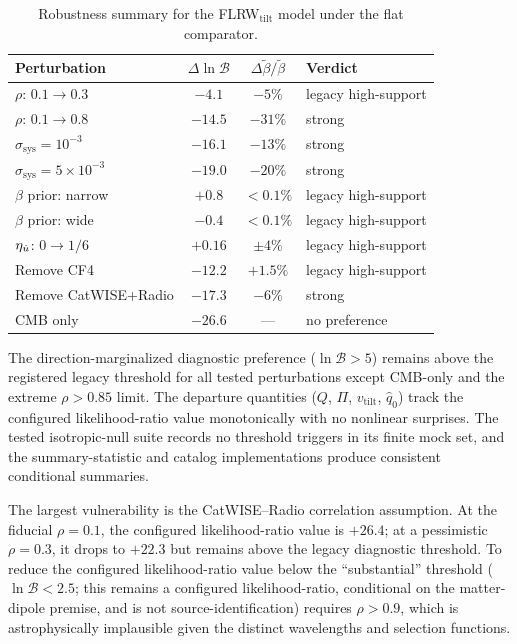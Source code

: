 \begin{table}[t]
\caption{Robustness summary for the FLRW$_\mathrm{tilt}$ model
  under the flat comparator.}
\label{tab:robust-summary}
\centering\small
\begin{tabular}{lccl}
\hline\hline
Perturbation & $\Delta\ln\mathcal{B}$ &
  $\Delta\tilde{\beta}/\tilde{\beta}$ & Verdict \\
\hline
$\rho$: $0.1 \to 0.3$ & $-4.1$ & $-5\%$ & legacy high-support \\
$\rho$: $0.1 \to 0.8$ & $-14.5$ & $-31\%$ & strong \\
$\sigma_{\mathrm{sys}} = 10^{-3}$ & $-16.1$ & $-13\%$ & strong \\
$\sigma_{\mathrm{sys}} = 5\!\times\!10^{-3}$ & $-19.0$ & $-20\%$
  & strong \\
$\beta$ prior: narrow & $+0.8$ & $< 0.1\%$ & legacy high-support \\
$\beta$ prior: wide   & $-0.4$ & $< 0.1\%$ & legacy high-support \\
$\eta_{\dot{u}}$: $0 \to 1/6$ & $+0.16$ & $\pm 4\%$ & legacy high-support \\
Remove CF4            & $-12.2$ & $+1.5\%$ & legacy high-support \\
Remove CatWISE+Radio  & $-17.3$ & $-6\%$   & strong \\
CMB only              & $-26.6$ & --- & no preference \\
\hline\hline
\end{tabular}
\end{table}

The direction-marginalized diagnostic preference
($\ln\mathcal{B} > 5$) remains above the registered legacy
threshold for all tested perturbations except CMB-only and the
extreme $\rho > 0.85$ limit.
The departure quantities ($Q$, $\Pi$, $v_{\mathrm{tilt}}$,
$\hat{q}_0$) track the configured likelihood-ratio value monotonically with no nonlinear
surprises.  The tested isotropic-null suite records no threshold
triggers in its finite mock set, and the summary-statistic and
catalog implementations produce consistent conditional summaries.

The largest vulnerability is the CatWISE--Radio correlation
assumption.  At the fiducial $\rho = 0.1$, the configured likelihood-ratio value is
$+26.4$; at a pessimistic $\rho = 0.3$, it drops to $+22.3$
but remains above the legacy diagnostic threshold.  To reduce
the configured likelihood-ratio value below the
``substantial'' threshold ($\ln\mathcal{B} < 2.5$; this remains a
configured likelihood-ratio, conditional on the matter-dipole
premise, and is not source-identification) requires
$\rho > 0.9$, which is astrophysically implausible given the
distinct wavelengths and selection functions.

